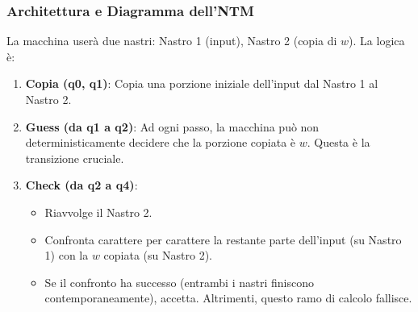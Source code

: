 \documentclass[a4paper]{article}
\theoremstyle{definition} %
\begin{document}
\subsubsection{Architettura e Diagramma dell'NTM}
La macchina userà due nastri: Nastro 1 (input), Nastro 2 (copia di $w$).
La logica è:
\begin{enumerate}
    \item \textbf{Copia (q0, q1)}: Copia una porzione iniziale dell'input dal Nastro 1 al Nastro 2.
    \item \textbf{Guess (da q1 a q2)}: Ad ogni passo, la macchina può non deterministicamente decidere che la porzione copiata è $w$. Questa è la transizione cruciale.
    \item \textbf{Check (da q2 a q4)}:
    \begin{itemize}
        \item Riavvolge il Nastro 2.
        \item Confronta carattere per carattere la restante parte dell'input (su Nastro 1) con la $w$ copiata (su Nastro 2).
        \item Se il confronto ha successo (entrambi i nastri finiscono contemporaneamente), accetta. Altrimenti, questo ramo di calcolo fallisce.
    \end{itemize}
\end{enumerate}
\end{document}
